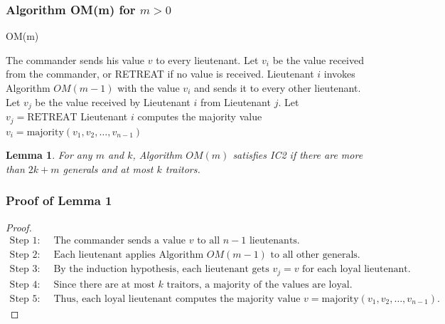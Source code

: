 \documentclass[12pt]{article}
\newtheorem{lemma}{Lemma}
\theoremstyle{remark}
\newtheorem*{proof}{Proof}
\begin{document}
\subsubsection*{Algorithm OM(m) for \( m > 0 \)}
\begin{algorithm}[H]
\caption{OM(m)}
\begin{algorithmic}[1]
\State The commander sends his value \( v \) to every lieutenant.
    \State Let \( v_i \) be the value received from the commander, or RETREAT if no value is received.
    \State Lieutenant \( i \) invokes Algorithm \( OM(m-1) \) with the value \( v_i \) and sends it to every other lieutenant.
\EndFor
{}
    \State Let \( v_j \) be the value received by Lieutenant \( i \) from Lieutenant \( j \).
        \State Let \( v_j = \text{RETREAT} \)
    \EndIf
    \State Lieutenant \( i \) computes the majority value \( v_i=\text{majority}(v_1, v_2, \dots, v_{n-1}) \)
\EndFor
\end{algorithmic}
\end{algorithm}



\begin{lemma}
  For any \( m \) and \( k \), Algorithm \( OM(m) \) satisfies IC2 if there are more than \( 2k + m \) generals and at most \( k \) traitors.
\end{lemma}

\subsubsection*{Proof of Lemma 1}
\begin{proof}
\begin{align*}
    \text{Step 1:} \quad & \text{The commander sends a value } v \text{ to all } n-1 \text{ lieutenants.} \\
\text{Step 2:} \quad & \text{Each lieutenant applies Algorithm } OM(m-1) \text{ to all other generals.} \\
\text{Step 3:} \quad & \text{By the induction hypothesis, each lieutenant gets } v_j = v \text{ for each loyal lieutenant.} \\
\text{Step 4:} \quad & \text{Since there are at most } k \text{ traitors, a majority of the values are loyal.} \\
\text{Step 5:} \quad & \text{Thus, each loyal lieutenant computes the majority value } v = \text{majority}(v_1, v_2, \dots, v_{n-1}).
\end{align*}
\end{proof}
\end{document}

